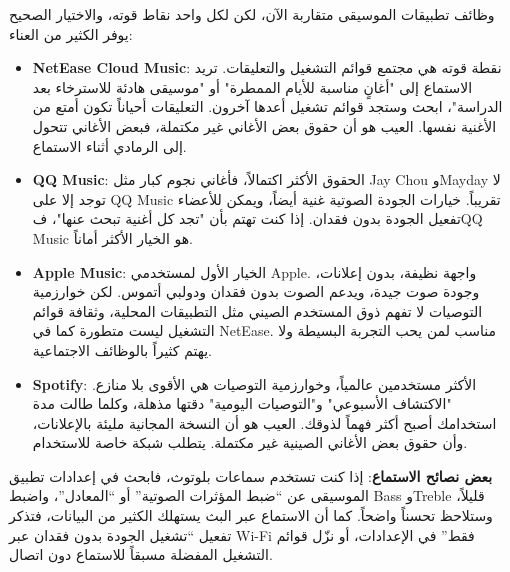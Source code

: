 


وظائف تطبيقات الموسيقى متقاربة الآن، لكن لكل واحد نقاط قوته، والاختيار الصحيح يوفر الكثير من العناء:

\begin{itemize}
  \item \textbf{NetEase Cloud Music}: نقطة قوته هي مجتمع قوائم التشغيل والتعليقات. تريد الاستماع إلى "أغانٍ مناسبة للأيام الممطرة" أو "موسيقى هادئة للاسترخاء بعد الدراسة"، ابحث وستجد قوائم تشغيل أعدها آخرون. التعليقات أحياناً تكون أمتع من الأغنية نفسها. العيب هو أن حقوق بعض الأغاني غير مكتملة، فبعض الأغاني تتحول إلى الرمادي أثناء الاستماع.
  \item \textbf{QQ Music}: الحقوق الأكثر اكتمالاً، فأغاني نجوم كبار مثل Jay Chou وMayday لا توجد إلا على QQ Music تقريباً. خيارات الجودة الصوتية غنية أيضاً، ويمكن للأعضاء تفعيل الجودة بدون فقدان. إذا كنت تهتم بأن "تجد كل أغنية تبحث عنها"، فQQ Music هو الخيار الأكثر أماناً.
  \item \textbf{Apple Music}: الخيار الأول لمستخدمي Apple. واجهة نظيفة، بدون إعلانات، وجودة صوت جيدة، ويدعم الصوت بدون فقدان ودولبي أتموس. لكن خوارزمية التوصيات لا تفهم ذوق المستخدم الصيني مثل التطبيقات المحلية، وثقافة قوائم التشغيل ليست متطورة كما في NetEase. مناسب لمن يحب التجربة البسيطة ولا يهتم كثيراً بالوظائف الاجتماعية.
  \item \textbf{Spotify}: الأكثر مستخدمين عالمياً، وخوارزمية التوصيات هي الأقوى بلا منازع. "الاكتشاف الأسبوعي" و"التوصيات اليومية" دقتها مذهلة، وكلما طالت مدة استخدامك أصبح أكثر فهماً لذوقك. العيب هو أن النسخة المجانية مليئة بالإعلانات، وأن حقوق بعض الأغاني الصينية غير مكتملة. يتطلب شبكة خاصة للاستخدام.
\end{itemize}

\textbf{بعض نصائح الاستماع}: إذا كنت تستخدم سماعات بلوتوث، فابحث في إعدادات تطبيق الموسيقى عن “ضبط المؤثرات الصوتية” أو “المعادل”، واضبط Bass وTreble قليلاً، وستلاحظ تحسناً واضحاً. كما أن الاستماع عبر البث يستهلك الكثير من البيانات، فتذكر تفعيل “تشغيل الجودة بدون فقدان عبر Wi-Fi فقط” في الإعدادات، أو نزّل قوائم التشغيل المفضلة مسبقاً للاستماع دون اتصال.

